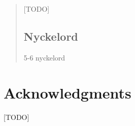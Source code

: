 \clearpage

\begin{abstract}
\markboth{\abstractname}{}
[TODO]

\subsection*{Nyckelord}
5-6 nyckelord

\end{abstract}

\clearpage

\section*{Acknowledgments}

[TODO]

\acknowlegmentssignature

\renewcommand{\chaptermark}[1]{ \markboth{#1}{}} 
\tableofcontents
\markboth{\contentsname}{}

\clearpage\listoffigures
\clearpage\listoftables
\clearpage\lstlistoflistings
\clearpage\printglossary[type=\acronymtype, title={List of acronyms and abbreviations}]

\label{pg:lastPageofPreface}
